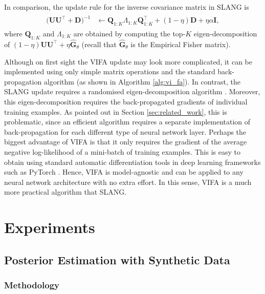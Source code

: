 \documentclass[msc,deptreport.inf]{infthesis} %
\newcommand{\matr}[1]{\mathbf{#1}}
\begin{document}
In comparison, the update rule for the inverse covariance matrix in SLANG is 
\begin{align}
\begin{split}
	\big(\matr{U}\matr{U}^\intercal + \matr{D}\big)^{-1}
	& \leftarrow  \matr{Q}_{1:K} \Lambda_{1:K} \matr{Q}_{1:K}^\intercal
	+ (1 - \eta) \matr{D} + \eta \alpha \matr{I},
\end{split}
\end{align}
where $\matr{Q}_{1:K}$ and $\Lambda_{1:K}$ are obtained by computing the top-$K$ eigen-decomposition of $(1 - \eta) \matr{U} \matr{U}^\intercal + \eta \hat{\matr{G}}_\theta$ (recall that $\hat{\matr{G}}_\theta$ is the Empirical Fisher matrix). 

Although on first sight the VIFA update may look more complicated, it can be implemented using only simple matrix operations and the standard back-propagation algorithm (as shown in Algorithm \ref{alg:vi_fa}). In contrast, the SLANG update requires a randomised eigen-decomposition algorithm \cite{mishkin2018}. Moreover, this eigen-decomposition requires the back-propagated gradients of individual training examples. As pointed out in Section \ref{sec:related_work}, this is problematic, since an efficient algorithm requires a separate implementation of back-propagation for each different type of neural network layer. Perhaps the biggest advantage of VIFA is that it only requires the gradient of the average negative log-likelihood of a mini-batch of training examples. This is easy to obtain using standard automatic differentiation tools in deep learning frameworks such as PyTorch \cite{paszke2019}. Hence, VIFA is model-agnostic and can be applied to any neural network architecture with no extra effort. In this sense, VIFA is a much more practical algorithm that SLANG.


\section{Experiments}

\subsection{Posterior Estimation with Synthetic Data}
 
\subsubsection{Methodology}
\end{document}
